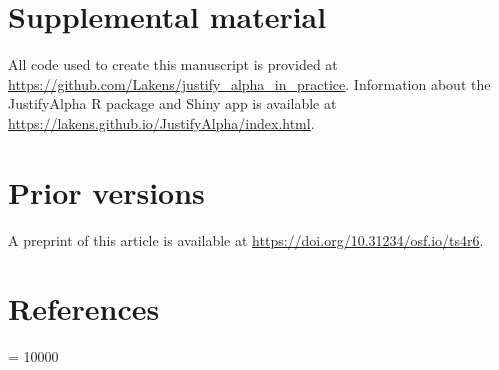 \documentclass[
  english,
  ,man, a4paper,floatsintext]{apa6}
\begin{document}
\hypertarget{supplemental-material}{%
\section{Supplemental material}\label{supplemental-material}}

All code used to create this manuscript is provided at \url{https://github.com/Lakens/justify_alpha_in_practice}. Information about the JustifyAlpha R package and Shiny app is available at \url{https://lakens.github.io/JustifyAlpha/index.html}.

\hypertarget{prior-versions}{%
\section{Prior versions}\label{prior-versions}}

A preprint of this article is available at \url{https://doi.org/10.31234/osf.io/ts4r6}.

\newpage

\hypertarget{references}{%
\section{References}\label{references}}

\begingroup

\interlinepenalty = 10000
\end{document}
